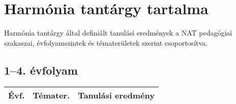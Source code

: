 
\section{Harmónia tantárgy tartalma }
Harmónia tantárgy által definiált tanulási eredmények a NAT pedagógiai szakaszai, évfolyamszintek és tématerületek szerint csoportosítva.

\subsection{1--4. évfolyam}
\begin{small}
  \begin{longtable}{c | p{2cm} |  p{11cm} }
    \textbf{Évf.} & \textbf{Témater.} & \textbf{Tanulási eredmény} \\ \hline \hline
    \endhead


\end{longtable}
\end{small}
